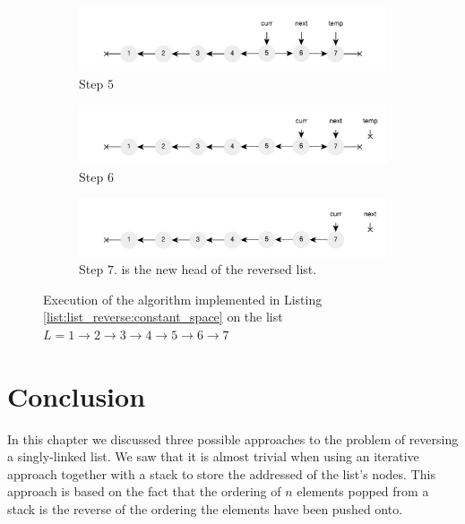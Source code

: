 \begin{figure}
\begin{subfigure}[t]{0.49\textwidth}
	 \end{subfigure}
	 \hfill
	 \begin{subfigure}[t]{0.49\textwidth}
		\centering
		\includegraphics[width=\textwidth]{sources/list_reverse/images/list_reverse_iterative5}
		\caption[]{Step $5$}
		\label{fig:list_reverse:list_reverse_iterative5}
	 \end{subfigure}
	 \hfill
	 \begin{subfigure}[t]{0.49\textwidth}
		\centering
		\includegraphics[width=\textwidth]{sources/list_reverse/images/list_reverse_iterative6}
		\caption[]{Step $6$}
		\label{fig:list_reverse:list_reverse_iterative6}
	 \end{subfigure}
	 \hfill
	 \begin{subfigure}[t]{0.49\textwidth}
		\centering
		\includegraphics[width=\textwidth]{sources/list_reverse/images/list_reverse_iterative7}
		\caption[]{Step $7$.  is the new head of the reversed list.}
		\label{fig:list_reverse:list_reverse_iterative7}
	 \end{subfigure}
\caption{Execution of the algorithm implemented in Listing \ref{list:list_reverse:constant_space} on the list $L = 1 \rightarrow 2 \rightarrow 3 \rightarrow 4 \rightarrow 5 \rightarrow 6 \rightarrow 7$}
\label{fig:list_reverse:list_reverse_iterative_execution}
\end{figure}

\section{Conclusion}
In this chapter we discussed three possible approaches to the problem of reversing a singly-linked list.
We saw that it is almost trivial when using an iterative approach together with a stack to store the addressed of the list's nodes. 
This approach is based on the fact that the ordering of $n$  elements popped from a stack is the reverse of the ordering the elements have been pushed onto.

